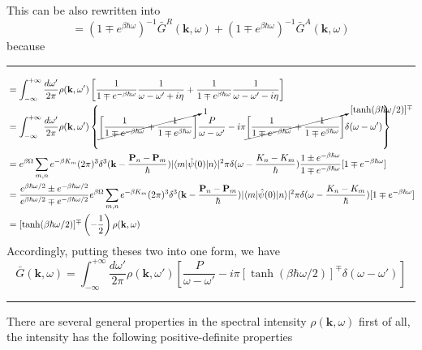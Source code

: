 This can be also rewritten into
\begin{equation}\tag{4.7.21'}
=(1\mp e^{\beta\hbar \omega})^{-1} \bar G^R(\mathbf{k},\omega)+(1\mp e^{\beta\hbar \omega})^{-1} \bar G^A(\mathbf{k},\omega)
\end{equation}
because\\
\rule{\textwidth}{0.2mm}
\begin{equation}
\begin{aligned}
&=\int_{-\infty}^{+\infty} \frac{d\omega'}{2\pi} \rho(\mathbf{k},\omega') \left[ \frac{1}{1\mp e^{-\beta\hbar\omega}} \frac{1}{\omega-\omega'+i\eta} +\frac{1}{1\mp e^{\beta\hbar\omega}} \frac{1}{\omega-\omega'-i\eta} \right]\\
&=\int_{-\infty}^{+\infty} \frac{d\omega'}{2\pi} \rho(\mathbf{k},\omega') \left\{ \cancelto{1}{\left[ \frac{1}{1\mp e^{-\beta\hbar\omega}}+\frac{1}{1\mp e^{\beta\hbar\omega}} \right]} \frac{P}{\omega-\omega'} -i\pi  \cancelto{[\tanh(\beta\hbar\omega/2)]^\mp}{\left[ \frac{1}{1\mp e^{-\beta\hbar\omega}}+\frac{1}{1\mp e^{\beta\hbar\omega}} \right]} \delta(\omega-\omega')\right\}\\
&=e^{\beta\Omega} \sum_{m,n} e^{-\beta K_m} (2\pi)^3 \delta^3 (\mathbf{k}-\frac{\mathbf{P}_n-\mathbf{P}_m}{\hbar}) |\langle m|\hat{\psi}(0) |n\rangle |^2 \pi \delta(\omega-\frac{K_n-K_m}{\hbar}) \frac{1\pm e^{-\beta\hbar \omega}}{1\mp e^{-\beta\hbar \omega}} [1\mp e^{-\beta\hbar\omega}]\\
&=\frac{e^{\beta\hbar\omega/2}\pm e^{-\beta\hbar \omega/2}}{e^{\beta\hbar\omega/2}\mp e^{-\beta\hbar \omega/2}} e^{\beta\Omega} \sum_{m,n}  e^{-\beta K_m}(2\pi)^3 \delta^3 (\mathbf{k}-\frac{\mathbf{P}_n-\mathbf{P}_m}{\hbar}) |\langle m|\hat{\psi}(0) |n\rangle |^2 \pi \delta(\omega-\frac{K_n-K_m}{\hbar})[1\mp e^{-\beta\hbar\omega}]\\
&=[\tanh (\beta\hbar\omega/2)]^\mp \left( -\frac{1}{2} \right) \rho(\mathbf{k},\omega)
\end{aligned}
\end{equation}
Accordingly, putting theses two into one form, we have
\begin{equation}
\bar G(\mathbf{k},\omega) = \int_{-\infty}^{+\infty} \frac{d\omega'}{2\pi} \rho(\mathbf{k},\omega') \left[ \frac{P}{\omega-\omega'} -i\pi [\tanh (\beta\hbar\omega/2)]^\mp\delta(\omega-\omega')\right]
\end{equation}
\rule{\textwidth}{0.2mm}
 There are several general properties in the spectral intensity $\rho(\mathbf{k},\omega)$
 first of all, the intensity has the following positive-definite properties
